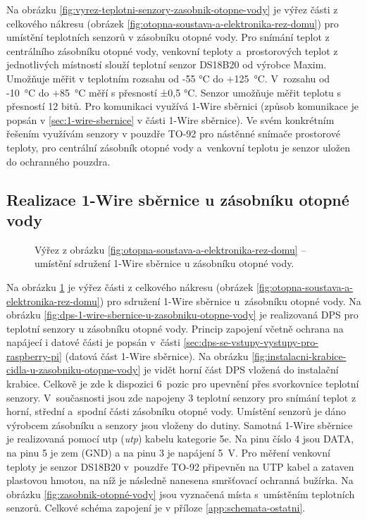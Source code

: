 Na obrázku \ref{fig:vyrez-teplotni-senzory-zasobnik-otopne-vody} je výřez části z celkového nákresu (obrázek \ref{fig:otopna-soustava-a-elektronika-rez-domu}) pro umístění teplotních senzorů v zásobníku otopné vody. Pro snímání teplot z centrálního zásobníku otopné vody, venkovní teploty a~prostorových teplot z jednotlivých místností slouží teplotní senzor DS18B20 \cite{vyrobce-ds18b20} od výrobce Maxim. Umožňuje měřit v teplotním rozsahu od -55 °C do +125~°C. V~rozsahu od -10~°C do +85~°C měří s přesností ±0,5 °C. Senzor umožňuje měřit teplotu s přesností 12 bitů. Pro komunikaci využívá 1-Wire sběrnici (způsob komunikace je popsán v \ref{sec:1-wire-sbernice} v části 1-Wire sběrnice). Ve svém konkrétním řešením využívám senzory v pouzdře TO-92 pro nástěnné snímače prostorové teploty, pro centrální zásobník otopné vody a~venkovní teplotu je senzor uložen do ochranného pouzdra.

\subsection{Realizace 1-Wire sběrnice u zásobníku otopné vody}
\begin{figure}[H]
   \centering
   \def\svgwidth{0.2\columnwidth}
   
   \caption[Výřez pro umístění sdružení 1-Wire sběrnice u zásobníku otopné vody.]{Výřez z obrázku \ref{fig:otopna-soustava-a-elektronika-rez-domu} – umístění sdružení 1-Wire sběrnice u zásobníku otopné vody.}
    \label{fig:vyrez-1-wire-sbernice-u-zasobniku-otopne-vody}
\end{figure}

Na obrázku \ref{fig:vyrez-1-wire-sbernice-u-zasobniku-otopne-vody} je výřez části z celkového nákresu (obrázek \ref{fig:otopna-soustava-a-elektronika-rez-domu}) pro sdružení 1-Wire sběrnice u~zásobníku otopné vody. Na obrázku \ref{fig:dps-1-wire-sbernice-u-zasobniku-otopne-vody} je realizovaná DPS pro teplotní senzory u zásobníku otopné vody. Princip zapojení včetně ochrana na napájecí i datové části je popsán v~části \ref{sec:dps-se-vstupy-vystupy-pro-raspberry-pi} (datová část 1-Wire sběrnice). Na obrázku \ref{fig:instalacni-krabice-cidla-u-zasobniku-otopne-vody} je vidět horní část DPS vložená do instalační krabice. Celkově je zde k dispozici 6~pozic pro upevnění přes svorkovnice teplotní senzory. V~současnosti jsou zde napojeny 3 teplotní senzory pro snímání teplot z horní, střední a~spodní části zásobníku otopné vody. Umístění senzorů je dáno výrobcem zásobníku a senzory jsou vloženy do dutiny. Samotná 1-Wire sběrnice je realizovaná pomocí \acrshort{utp} (\textit{\acrlong{utp}}) kabelu kategorie 5e. Na pinu číslo 4 jsou DATA, na pinu 5 je zem (GND) a na pinu 3 je napájení 5~V. Pro měření venkovní teploty je senzor DS18B20 v~pouzdře TO-92 připevněn na UTP kabel a zataven plastovou hmotou, na níž je následně nanesena smršťovací ochranná bužírka. Na obrázku \ref{fig:zasobnik-otopné-vody} jsou vyznačená místa s~umístěním teplotních senzorů. Celkové schéma zapojení je v příloze \ref{app:schemata-ostatni}.

